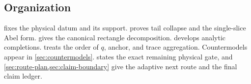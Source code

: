 \subsection{Organization}

 fixes the physical datum and its support.
 proves tail collapse and the single-slice Abel
form.   gives the canonical rectangle
decomposition.   develops analytic completions.
 treats the order of \(q\), anchor, and trace
aggregation.  Countermodels appear in \cref{sec:countermodels}.
 states the exact remaining physical gate, and
\cref{sec:route-plan,sec:claim-boundary} give the adaptive next route and
the final claim ledger.
